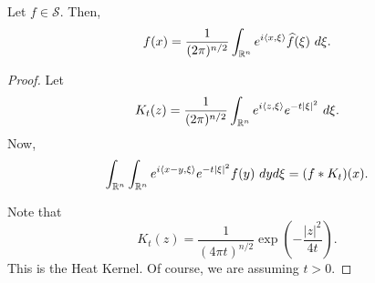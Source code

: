 \begin{theorem}
    Let $f\in\mathscr S$. Then, 
    \begin{equation*}
        f(x) = \frac{1}{(2\pi)^{n/2}}\int_{\mathbb{R}^n}e^{i\langle x,\xi\rangle}\widehat{f}(\xi)~d\xi.
    \end{equation*}
\end{theorem}
\begin{proof}
    Let 
    \begin{equation*}
        K_t(z) = \frac{1}{(2\pi)^{n/2}}\int_{\mathbb{R}^n}e^{i\langle z,\xi\rangle} e^{-t|\xi|^2}~d\xi.
    \end{equation*}
    Now, 
    \begin{equation*}
        \int_{\mathbb{R}^n}\int_{\mathbb{R}^n}e^{i\langle x - y, \xi\rangle}e^{-t|\xi|^2}f(y)~dyd\xi = (f\ast K_t)(x).
    \end{equation*}

    Note that 
    \begin{equation*}
        K_t(z) = \frac{1}{(4\pi t)^{n/2}}\exp(-\frac{|z|^2}{4t}).
    \end{equation*}
    This is the Heat Kernel. Of course, we are assuming $t > 0$.
\end{proof}